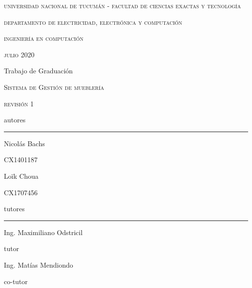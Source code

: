 \documentclass[a4paper,oneside]{book}
\begin{document}
\sloppy

\begin{titlepage}
	\centering
	{\scshape universidad nacional de tucumán - facultad de ciencias exactas y tecnología\par}
	{\scshape departamento de electricidad, electrónica y computación\par}
	{\scshape\Large ingeniería en computación\par}
	\vspace{0.5cm}
	{\scshape julio 2020\par} %
	\vfill
	{\LARGE\mdseries Trabajo de Graduación\par}
	\vspace{0.5cm}
	{\scshape\huge Sistema de Gestión de mueblería\par}
	{\scshape revisión 1\par}
	\vfill
	{\mdseries autores\par}
	\par\noindent\rule{0.9\textwidth}{0.2pt}
	\begin{multicols}{2}
	{\large Nicolás Bachs\par}
	{\small CX1401187\par}
	\columnbreak
	{\large Loïk Choua\par}
	{\small CX1707456\par}
	\end{multicols}
	\vspace{0.5cm}
	{\mdseries tutores\par}
	\par\noindent\rule{0.9\textwidth}{0.2pt}
	\begin{multicols}{2}
	{\large Ing. Maximiliano Odstricil\par}
	{\small tutor\par}
	\columnbreak
	{\large Ing. Matías Mendiondo\par}
	{\small co-tutor\par}
	\end{multicols}
\end{titlepage}



\tableofcontents





%
%
%
%
%
\end{document}
